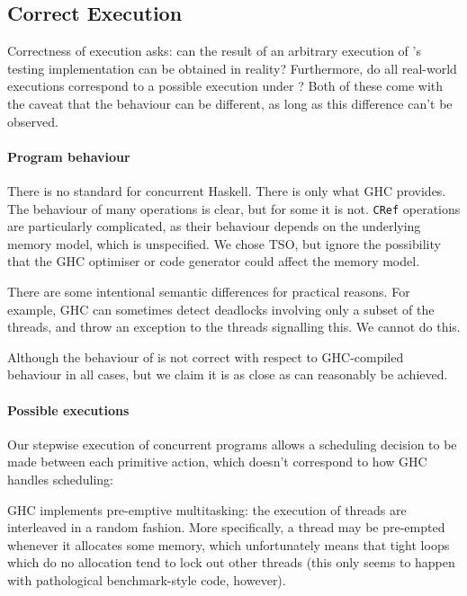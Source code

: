 \subsection{Correct Execution}

Correctness of execution asks: can the result of an arbitrary
execution of \dejafu{}'s testing implementation can be obtained in
reality?  Furthermore, do all real-world executions correspond to a
possible execution under \dejafu{}?  Both of these come with the
caveat that the behaviour can be different, as long as this difference
can't be observed.

\paragraph{Program behaviour}
There is no standard for concurrent Haskell.  There is only what GHC
provides.  The behaviour of many operations is clear, but for some it
is not.  \verb|CRef| operations are particularly complicated, as their
behaviour depends on the underlying memory model, which is
unspecified.  We chose TSO, but ignore the possibility that the GHC
optimiser or code generator could affect the memory model.

There are some intentional semantic differences for practical reasons.
For example, GHC can sometimes detect deadlocks involving only a
subset of the threads, and throw an exception to the threads
signalling this.  We cannot do this.

Although the behaviour of \dejafu{} is not correct with respect to
GHC-compiled behaviour in all cases, but we claim it is as close as
can reasonably be achieved.

\paragraph{Possible executions}
Our stepwise execution of concurrent programs allows a scheduling
decision to be made between each primitive action, which doesn't
correspond to how GHC handles scheduling:

\begin{displayquote}
  GHC implements pre-emptive multitasking: the execution of threads
  are interleaved in a random fashion.  More specifically, a thread may
  be pre-empted whenever it allocates some memory, which unfortunately
  means that tight loops which do no allocation tend to lock out other
  threads (this only seems to happen with pathological benchmark-style
  code, however).\cite{control_concurrent}
\end{displayquote}

